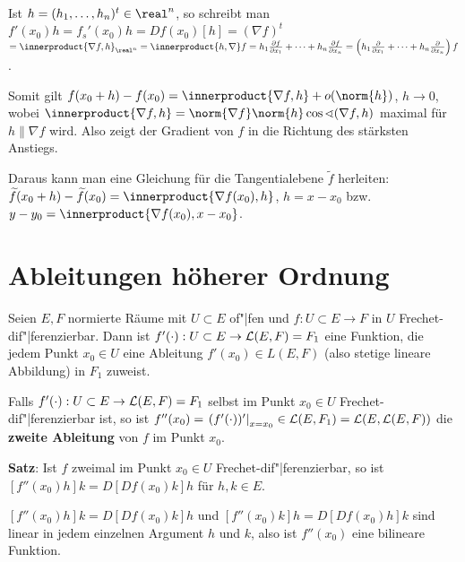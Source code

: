 Ist $h = (h_1, \dotsc, h_n)^t \in \real^n$, so schreibt man
$f'(x_0)h = f_s'(x_0)h = Df(x_0)[h] =
(\nabla f)^t$ 
$= \innerproduct{\nabla f, h}_{\real^n} = \innerproduct{h, \nabla} f =
h_1 \frac{\partial f}{\partial x_1} + \dotsb +
h_n \frac{\partial f}{\partial x_n} =
\left(h_1 \frac{\partial}{\partial x_1} + \dotsb +
h_n \frac{\partial}{\partial x_n}\right) f$.

Somit gilt $f(x_0 + h) - f(x_0) = \innerproduct{\nabla f, h} + o(\norm{h})$, $h \to 0$,
wobei $\innerproduct{\nabla f, h} =
\norm{\nabla f} \norm{h} \cos \sphericalangle(\nabla f, h)$ maximal für
$h \parallel \nabla f$ wird.
Also zeigt der Gradient von $f$ in die Richtung des stärksten Anstiegs.

Daraus kann man eine Gleichung für die Tangentialebene $\widetilde{f}$
herleiten: \\
$\widetilde{f}(x_0 + h) - \widetilde{f}(x_0) = \innerproduct{\nabla f(x_0), h}$,
$h = x - x_0$ bzw.
$y - y_0 = \innerproduct{\nabla f(x_0), x - x_0}$.

\section{%
    Ableitungen höherer Ordnung%
}

Seien $E, F$ normierte Räume mit $U \subset E$ of"|fen und
$f: U \subset E \rightarrow F$ in $U$ Frechet-dif"|ferenzierbar.
Dann ist $f'(\cdot): U \subset E \rightarrow \mathcal{L}(E, F) = F_1$ eine Funktion,
die jedem Punkt $x_0 \in U$ eine Ableitung $f'(x_0) \in L(E, F)$
(also stetige lineare Abbildung) in $F_1$ zuweist.

Falls $f'(\cdot): U \subset E \rightarrow \mathcal{L}(E, F) = F_1$ selbst im
Punkt $x_0 \in U$ Frechet-dif"|ferenzierbar ist, so ist
$f''(x_0) = \left.(f'(\cdot))'\right|_{x=x_0} \in \mathcal{L}(E, F_1) = \mathcal{L}(E, \mathcal{L}(E, F))$
die \textbf{zweite Ableitung} von $f$ im Punkt $x_0$.

\linie

\textbf{Satz}:
Ist $f$ zweimal im Punkt $x_0 \in U$ Frechet-dif"|ferenzierbar, so ist
$[f''(x_0)h]k = D[Df(x_0)k]h$ für $h, k \in E$.

$[f''(x_0)h]k = D[Df(x_0)k]h$ und $[f''(x_0)k]h = D[Df(x_0)h]k$
sind linear in jedem einzelnen Argument $h$ und $k$, also ist
$f''(x_0)$ eine bilineare Funktion.

